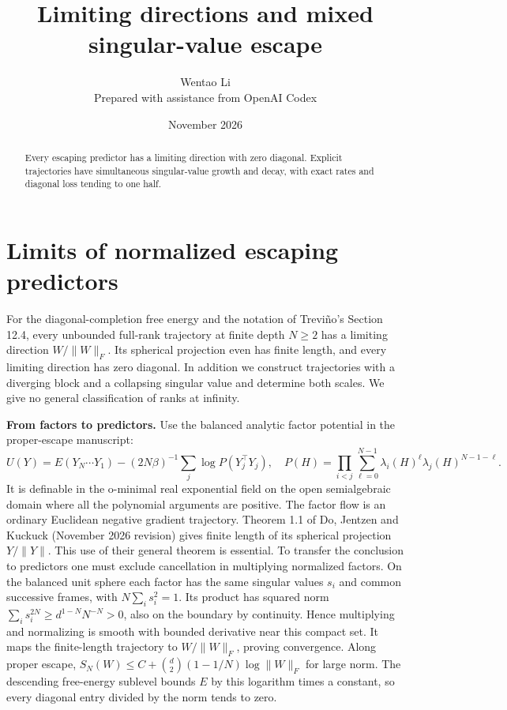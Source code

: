 \documentclass[10pt]{article}
\title{Limiting directions and mixed singular-value escape}
\author{Wentao Li\\{\small Prepared with assistance from OpenAI Codex}}
\date{November 2026}
\begin{document}
\maketitle
\begin{abstract}
Every escaping predictor has a limiting direction with zero diagonal. Explicit trajectories have simultaneous singular-value growth and decay, with exact rates and diagonal loss tending to one half.
\end{abstract}
\section*{Limits of normalized escaping predictors}
For the diagonal-completion free energy and the notation of Treviño's Section 12.4, every unbounded full-rank trajectory at finite depth $N\ge2$ has a limiting direction $W/\|W\|_F$. Its spherical projection even has finite length, and every limiting direction has zero diagonal. In addition we construct trajectories with a diverging block and a collapsing singular value and determine both scales. We give no general classification of ranks at infinity.

\textbf{From factors to predictors.} Use the balanced analytic factor potential in the proper-escape manuscript:
\[
 U(Y)=E(Y_N\cdots Y_1)-(2N\beta)^{-1}\sum_j\log P(Y_j^\top Y_j),\quad
 P(H)=\prod_{i<j}\sum_{\ell=0}^{N-1}\lambda_i(H)^\ell\lambda_j(H)^{N-1-\ell}.
\]
It is definable in the o-minimal real exponential field on the open semialgebraic domain where all the polynomial arguments are positive. The factor flow is an ordinary Euclidean negative gradient trajectory. Theorem 1.1 of Do, Jentzen and Kuckuck (November 2026 revision) gives finite length of its spherical projection $Y/\|Y\|$. This use of their general theorem is essential. To transfer the conclusion to predictors one must exclude cancellation in multiplying normalized factors. On the balanced unit sphere each factor has the same singular values $s_i$ and common successive frames, with $N\sum_i s_i^2=1$. Its product has squared norm $\sum_i s_i^{2N}\ge d^{1-N}N^{-N}>0$, also on the boundary by continuity. Hence multiplying and normalizing is smooth with bounded derivative near this compact set. It maps the finite-length trajectory to $W/\|W\|_F$, proving convergence. Along proper escape, $S_N(W)\le C+\binom d2(1-1/N)\log\|W\|_F$ for large norm. The descending free-energy sublevel bounds $E$ by this logarithm times a constant, so every diagonal entry divided by the norm tends to zero.
\end{document}
